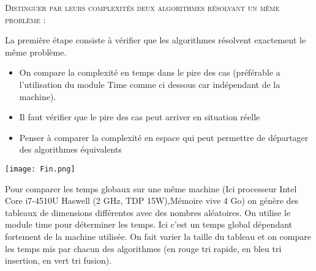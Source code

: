
\begin{prop}

\textsc{Distinguer par leurs complexités deux algorithmes résolvant
un même problème :}

La première étape consiste à vérifier que les algorithmes résolvent exactement le même problème.

\begin{itemize}
\item On compare la complexité en temps dans le pire des cas (préférable a l'utilisation du module Time comme ci dessous car indépendant de la machine).
\item Il faut vérifier que le pire des cas peut arriver en situation réelle
\item Penser à comparer la complexité en espace qui peut permettre de départager des algorithmes équivalents
\end{itemize}
\end{prop}


\begin{marginfigure}
\texttt{[image: Fin.png]}
\end{marginfigure}

\begin{exemple}

Pour comparer les temps globaux sur une même machine (Ici processeur	Intel Core i7-4510U Haswell (2 GHz, TDP 15W),Mémoire vive 4 Go) on génère des tableaux de dimensions différentes avec des nombres aléatoires.
On utilise le module time pour déterminer les temps. Ici c'est un temps global dépendant fortement de la machine utilisée.
On fait varier la taille du tableau et on compare les temps mis par chacun des algorithmes (en rouge tri rapide, en bleu tri insertion, en vert tri fusion). 



\end{exemple}




\begin{thebibliography}{2}




\end{thebibliography}

